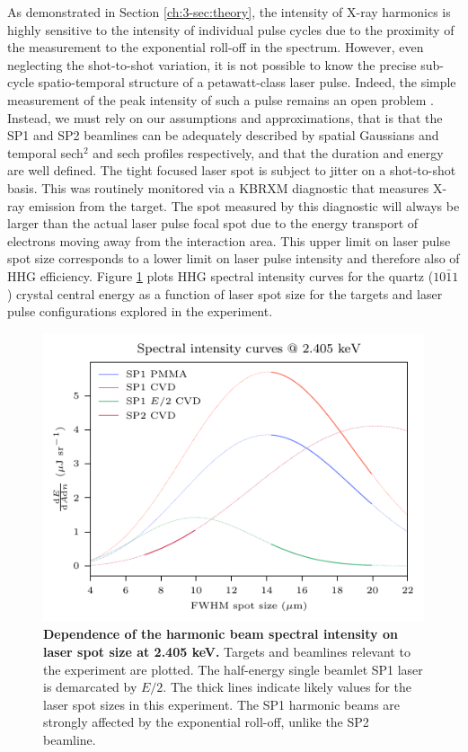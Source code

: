 As demonstrated in Section \ref{ch:3-sec:theory}, the intensity of X-ray harmonics is highly sensitive to the intensity of individual pulse cycles due to the proximity of the measurement to the exponential roll-off in the spectrum. However, even neglecting the shot-to-shot variation, it is not possible to know the precise sub-cycle spatio-temporal structure of a petawatt-class laser pulse. Indeed, the simple measurement of the peak intensity of such a pulse remains an open problem \cite{perevalovLaserPeelerRegime2023,ouatuIonizationStatesMultipetawatt2022}. Instead, we must rely on our assumptions and approximations, that is that the SP1 and SP2 beamlines can be adequately described by spatial Gaussians and temporal sech$^2$ and sech profiles respectively, and that the duration and energy are well defined. The tight focused laser spot is subject to jitter on a shot-to-shot basis. This was routinely monitored via a KBRXM diagnostic that measures X-ray emission from the target. The spot measured by this diagnostic will always be larger than the actual laser pulse focal spot due to the energy transport of electrons moving away from the interaction area. This upper limit on laser pulse spot size corresponds to a lower limit on laser pulse intensity and therefore also of HHG efficiency. Figure \ref{fig:orionintensitycurves} plots HHG spectral intensity curves for the quartz ($10\bar{1}1$) crystal central energy as a function of laser spot size for the targets and laser pulse configurations explored in the experiment. 
\begin{figure}
	\centering
	\includegraphics{figures/orion/orion_intensity_curves}
	\caption[Dependence of the harmonic beam spectral intensity on laser spot size at 2.405 keV.]{\textbf{Dependence of the harmonic beam spectral intensity on laser spot size at 2.405 keV.} Targets and beamlines relevant to the experiment are plotted. The half-energy single beamlet SP1 laser is demarcated by $E/2$. The thick lines indicate likely values for the laser spot sizes in this experiment. The SP1 harmonic beams are strongly affected by the exponential roll-off, unlike the SP2 beamline.}
	\label{fig:orionintensitycurves}
\end{figure}
